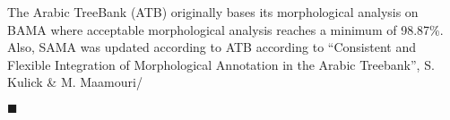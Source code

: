 \begin{enumerate}[leftmargin=0mm,label=\bfseries CommentR1.\arabic*]
The Arabic TreeBank (ATB) originally bases its morphological analysis on BAMA where acceptable morphological
analysis reaches a minimum of 98.87\%. 
Also, SAMA was updated according to ATB according to ``Consistent and Flexible Integration of Morphological Annotation in the Arabic Treebank'', S. Kulick \& M. Maamouri/

$\blacksquare$


\end{enumerate}
